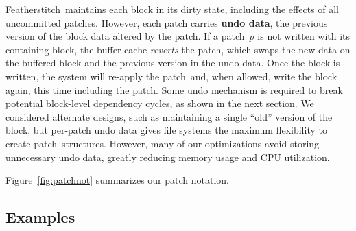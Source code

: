 \documentclass[9pt,twocolumn,letterpaper]{article}
\newcommand{\Kudos}{Featherstitch}
\newcommand{\Featherstitch}{\Kudos}
\newcommand{\patch}{patch}
\newcommand{\patches}{patches}
\begin{document}
%
\Featherstitch\ maintains each block in its dirty state, including the
 effects of all uncommitted patches.
%
However, each patch carries \textbf{undo data}, the 
 previous version of the block data altered by the \patch.
%
If a \patch\ $p$ is not written with its containing block, the buffer cache
 \emph{reverts} the \patch, which swaps the new data on the buffered block
 and the previous version in the undo data.
%
Once the block is written, the system will re-apply the \patch\ and, when
 allowed, write the block again, this time including the \patch.
%
Some undo mechanism is required to break potential block-level dependency cycles, as
 shown in the next section.
%
We considered alternate designs, such as maintaining a single ``old''
 version of the block, but per-patch undo data gives file systems the
 maximum flexibility to create \patch\ structures.
%
However, many of our optimizations avoid storing unnecessary undo data, greatly
 reducing memory usage and CPU utilization.

Figure~\ref{fig:patchnot} summarizes our patch notation.

\label{sec:patch:dependencies}

\begin{comment}
\paragraph{Example}
%
Suppose a \Kudos\ system contains the \patches\ in Figure~\ref{f:ex}c,
where the journal entry patches $d_\textrm{J}$, $i_\textrm{J}$, and
 $b_\textrm{J}$ have committed and all other patches have not.
%
The buffer cache cannot write blocks $\PBlock{b}$, $\PBlock{i}$, or $\PBlock{d}$,
since $\{b$, $i$, $i'$, $d\} \PDDepend \PXcmt$ and $\PXcmt \not\in \PDisk$.
%
Its only option is to write $\PBlock{\PXcmt}$ with $P = \{\PXcmt\}$, since
 $\PDepset{\PXcmt} = \{d_\textrm{J}$, $i_\textrm{J}$, $b_\textrm{J}\}
 \subseteq \PDisk$.
%
Since $\PXcmp$ has unmet dependencies on other blocks, it must be undone
 before the write and is excluded from $P$.
%
Later, when $\PXcmt$ commits, the buffer cache has the option to
write any of $\PBlock{b}$, $\PBlock{i}$, or $\PBlock{d}$.
\end{comment}


\subsection{Examples}
\label{sec:patch:examples}
\end{document}
